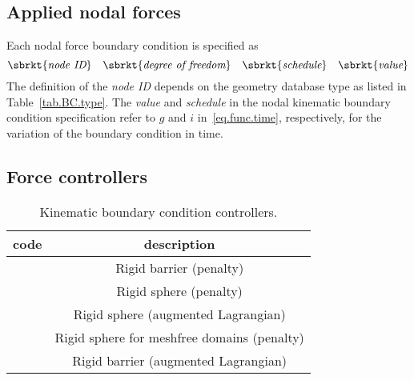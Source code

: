 \subsection{Applied nodal forces}
\label{set.ICandBC.FBC}
Each nodal force boundary condition is specified as
\[
\sbrkt{\textit{node ID}} \quad 
\sbrkt{\textit{degree of freedom}} \quad
\sbrkt{\textit{schedule}} \quad
\sbrkt{\textit{value}}
\]
The definition of the \textit{node ID} depends on the geometry 
database type as listed in Table~\ref{tab.BC.type}. 
The \textit{value} and \textit{schedule} in the nodal kinematic 
boundary condition specification refer to 
$g$ and $i$ in~\eqref{eq.func.time}, respectively, for the variation 
of the boundary condition in time.

\subsection{Force controllers}
\label{set.ICandBC.FBC.controller}

\begin{table}[h]
\caption{\label{tab.KBC.controller.type} Kinematic boundary condition controllers.}
\begin{center}
\begin{tabular}[c]{|c|c|}
\hline
 \parbox[b]{0.75in}{\centering \textbf{code}}
&\parbox[b]{4.0in}{\raggedright \textbf{description}}\\
\hline
\parbox[b]{0.75in}{} & 
\parbox[b]{4.0in}{\raggedright Rigid barrier (penalty)}\\
\hline
\parbox[b]{0.75in}{}  & 
\parbox[b]{4.0in}{\raggedright Rigid sphere (penalty)}\\
\hline
\parbox[b]{0.75in}{}  & 
\parbox[b]{4.0in}{\raggedright Rigid sphere (augmented Lagrangian)}\\
\hline
\parbox[b]{0.75in}{}  & 
\parbox[b]{4.0in}{\raggedright Rigid sphere for meshfree domains (penalty)}\\
\hline
\parbox[b]{0.75in}{}  & 
\parbox[b]{4.0in}{\raggedright Rigid barrier (augmented Lagrangian)}\\
\hline
\end{tabular}
\end{center}
\end{table}

\\

